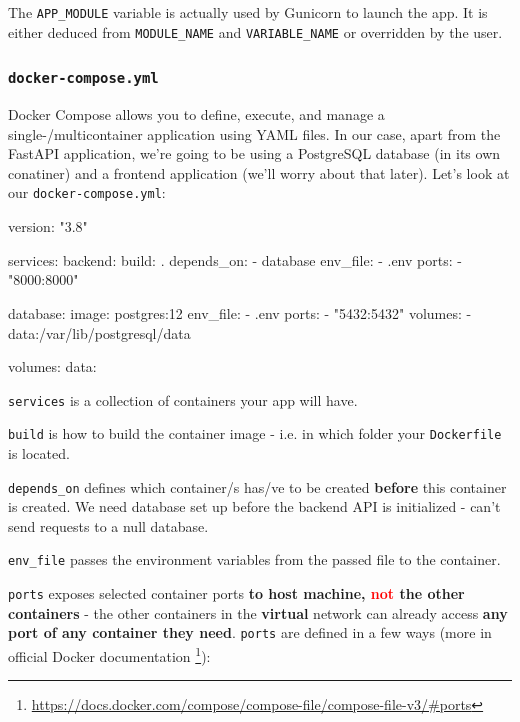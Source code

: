 \documentclass{article}
\newcommand{\flink}[1]{\footnote{\href{#1}{#1}}}
\newcommand{\dockerinline}[1]{\lstinline[language=docker, style=cstyle, basicstyle=\ttfamily\normalsize]{#1}}
\begin{document}
The \texttt{APP\_MODULE} variable is actually used by Gunicorn to launch the app. It is either deduced from \texttt{MODULE\_NAME} and \texttt{VARIABLE\_NAME} or overridden by the user.

\subsubsection{\texttt{docker-compose.yml}\label{preparations:dockercompose}}

Docker Compose allows you to define, execute, and manage a single-/multicontainer application using YAML files. In our case, apart from the FastAPI application, we're going to be using a PostgreSQL database (in its own conatiner) and a frontend application (we'll worry about that later). Let's look at our \texttt{docker-compose.yml}:

\begin{dockercode}
version: "3.8"

services:
    backend:
        build: .
        depends_on:
            - database
        env_file:
            - .env
        ports:
            - "8000:8000"

    database:
        image: postgres:12
        env_file:
            - .env
        ports:
            - "5432:5432"
        volumes:
            - data:/var/lib/postgresql/data

volumes:
    data:
\end{dockercode}

\dockerinline{services} is a collection of containers your app will have.

\dockerinline{build} is how to build the container image - i.e. in which folder your \texttt{Dockerfile} is located.

\dockerinline{depends_on} defines which container/s has/ve to be created \textbf{before} this container is created. We need database set up before the backend API is initialized - can't send requests to a null database.

\dockerinline{env_file} passes the environment variables from the passed file to the container.

\dockerinline{ports} exposes selected container ports \textbf{to host machine, \textcolor{red}{not} the other containers} - the other containers in the \textbf{virtual} network can already access \textbf{any port of any container they need}. \dockerinline{ports} are defined in a few ways (more in official Docker documentation \flink{https://docs.docker.com/compose/compose-file/compose-file-v3/\#ports}):
\end{document}
